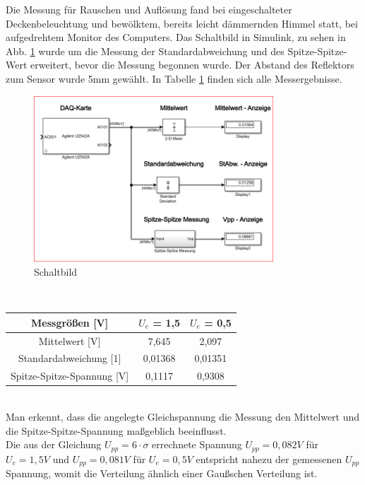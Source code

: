 Die Messung für Rauschen und Auflösung fand bei eingeschalteter Deckenbeleuchtung und bewölktem, bereits leicht dämmernden Himmel statt, bei aufgedrehtem Monitor des Computers. Das Schaltbild in Simulink, zu sehen in Abb. \ref{fg:schalt_rauschen} wurde um die Messung der Standardabweichung und des Spitze-Spitze-Wert erweitert, bevor die Messung begonnen wurde. Der Abstand des Reflektors zum Sensor wurde  5mm gewählt. In Tabelle \ref{tb:messerg} finden sich alle Messergebnisse.
\begin{figure}[h]
	\centering
	\includegraphics[width=0.8\textwidth]{./img/ch6/6_3_3}
	\caption{Schaltbild}
	\label{fg:schalt_rauschen}
\end{figure}
~\\
\begin{table}[!h]
	\centering
	\begin{tabular}{|c|c|c|}
	\hline 
	Messgrößen [V]			& $U_e$ = 1,5		& $U_e$ = 0,5 	\\ 
	\hline 
	Mittelwert [V]			& 7,645			& 2,097	\\ 
	\hline 
	Standardabweichung [1]		& 0,01368			& 0,01351	\\ 
	\hline 
	Spitze-Spitze-Spannung [V]	& 0,1117			& 0,9308	\\ 
	\hline 
	\end{tabular}
	\label{tb:messerg}
\end{table}
~\\
Man erkennt, dass die angelegte Gleichspannung die Messung den Mittelwert und die Spitze-Spitze-Spannung maßgeblich beeinflusst.
~\\
Die aus der Gleichung $U_{pp} = 6 \cdot \sigma$ errechnete Spannung $U_{pp} = 0,082V$ für $U_e = 1,5V$ und $U_{pp} = 0,081V$ für $U_e = 0,5V$ entspricht nahezu der gemessenen $U_{pp}$ Spannung, womit die Verteilung ähnlich einer Gaußschen Verteilung ist.
